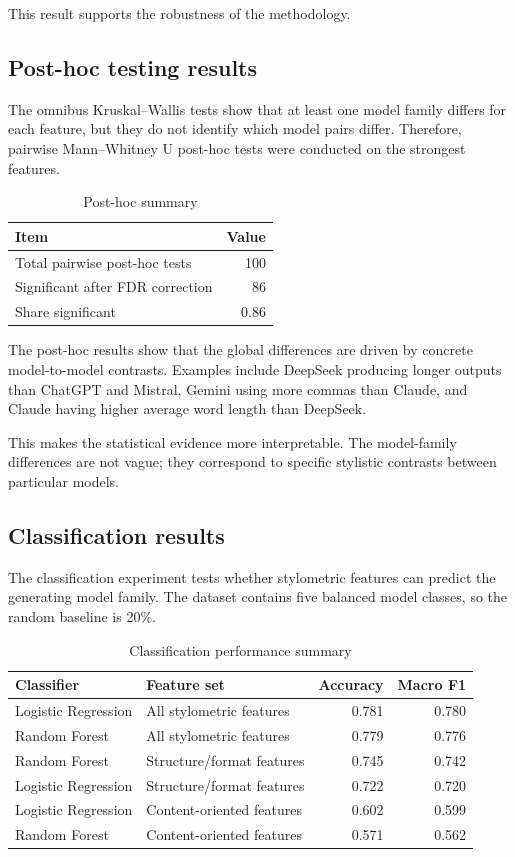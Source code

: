 This result supports the robustness of the methodology.

\subsection{Post-hoc testing results}
The omnibus Kruskal--Wallis tests show that at least one model family differs for each feature, but they do not identify which model pairs differ. Therefore, pairwise Mann--Whitney U post-hoc tests were conducted on the strongest features.

\begin{table}[ht]
\centering
\caption{Post-hoc summary}
\label{tab:posthoc-summary}
\begin{tabular}{lr}
\toprule
Item & Value \\
\midrule
Total pairwise post-hoc tests & 100 \\
Significant after FDR correction & 86 \\
Share significant & 0.86 \\
\bottomrule
\end{tabular}
\end{table}

The post-hoc results show that the global differences are driven by concrete model-to-model contrasts. Examples include DeepSeek producing longer outputs than ChatGPT and Mistral, Gemini using more commas than Claude, and Claude having higher average word length than DeepSeek.

This makes the statistical evidence more interpretable. The model-family differences are not vague; they correspond to specific stylistic contrasts between particular models.

\subsection{Classification results}
The classification experiment tests whether stylometric features can predict the generating model family. The dataset contains five balanced model classes, so the random baseline is 20\%.

\begin{table}[ht]
\centering
\caption{Classification performance summary}
\label{tab:classification-summary}
\begin{tabular}{llrr}
\toprule
Classifier & Feature set & Accuracy & Macro F1 \\
\midrule
Logistic Regression & All stylometric features & 0.781 & 0.780 \\
Random Forest & All stylometric features & 0.779 & 0.776 \\
Random Forest & Structure/format features & 0.745 & 0.742 \\
Logistic Regression & Structure/format features & 0.722 & 0.720 \\
Logistic Regression & Content-oriented features & 0.602 & 0.599 \\
Random Forest & Content-oriented features & 0.571 & 0.562 \\
\bottomrule
\end{tabular}
\end{table}

